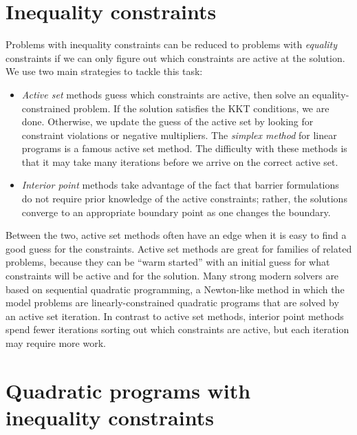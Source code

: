 \documentclass[12pt, leqno]{article} %
\begin{document}

\section{Inequality constraints}


Problems with inequality constraints can be reduced to problems with
{\em equality} constraints if we can only figure out which constraints
are active at the solution.  We use two main strategies to tackle
this task:
\begin{itemize}
\item {\em Active set} methods guess which constraints are active, then
  solve an equality-constrained problem.  If the solution satisfies
  the KKT conditions, we are done.  Otherwise, we update the guess of
  the active set by looking for constraint violations or negative
  multipliers.  The {\em simplex method} for linear programs is a
  famous active set method.  The difficulty with these methods is that
  it may take many iterations before we arrive on the correct active set.
\item {\em Interior point} methods take advantage of the fact that
  barrier formulations do not require prior knowledge of the active
  constraints; rather, the solutions converge to an appropriate
  boundary point as one changes the boundary.
\end{itemize}
Between the two, active set methods often have an edge when it is easy
to find a good guess for the constraints.  Active set methods are
great for families of related problems, because they can be ``warm
started'' with an initial guess for what constraints will be active
and for the solution.  Many strong modern solvers are based on
sequential quadratic programming, a Newton-like method in which the
model problems are linearly-constrained quadratic programs that are
solved by an active set iteration.  In contrast to active set methods,
interior point methods spend fewer iterations sorting out which
constraints are active, but each iteration may require more work.

\section{Quadratic programs with inequality constraints}
\end{document}
